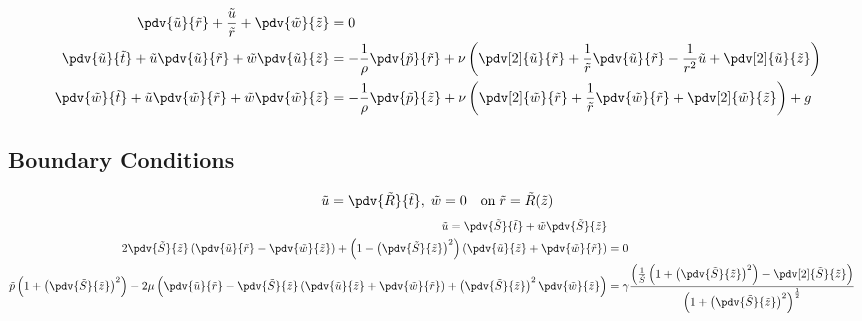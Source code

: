 \documentclass[12pt]{article}
\begin{document}
\begin{align}
\pdv{\tilde u}{\tilde r}+\frac{\tilde u}{\tilde r}+\pdv{\tilde w}{\tilde z}&=0\\
\pdv{\tilde u}{\tilde t}+\tilde u\pdv{\tilde u}{\tilde r}+\tilde w\pdv{\tilde u}{\tilde z}&=-\frac{1}{\rho}\pdv{\tilde p}{\tilde r}+\nu\left(\pdv[2]{\tilde u}{\tilde r}+\frac{1}{\tilde r}\pdv{\tilde u}{\tilde r}-\frac{1}{r^2}\tilde u+\pdv[2]{\tilde u}{\tilde z}\right)\\
\pdv{\tilde w}{\tilde t}+\tilde u\pdv{\tilde w}{\tilde r}+\tilde w\pdv{\tilde w}{\tilde z}&=-\frac{1}{\rho}\pdv{\tilde p}{\tilde z}+\nu\left(\pdv[2]{\tilde w}{\tilde r}+\frac{1}{\tilde r}\pdv{\tilde w}{\tilde r}+\pdv[2]{\tilde w}{\tilde z}\right) + g 
\end{align}
\subsection{Boundary Conditions}
\begin{align}
\tilde u=\pdv{\tilde R}{\tilde t},\;\tilde  w=0\quad\mathrm{on}\; \tilde r=\tilde R(\tilde z) 
\end{align}
\begin{align}
\tilde   u=\pdv{\tilde S}{\tilde t}+\tilde w\pdv{\tilde S}{\tilde z} \\
2\pdv{\tilde S}{\tilde z}\left(\pdv{\tilde u}{\tilde r}-\pdv{\tilde w}{\tilde z}\right)+\left(1-\left(\pdv{\tilde S}{\tilde z}\right)^2\right)\left(\pdv{\tilde u}{\tilde z}+\pdv{\tilde w}{\tilde r}\right)&=0\label{tangstress}\\
\tilde p\left(1+\left(\pdv{\tilde S}{\tilde z}\right)^2\right)-2\mu\left( \pdv{\tilde u}{\tilde r}-\pdv{\tilde S}{\tilde z}\left(\pdv{\tilde u}{\tilde z}+\pdv{\tilde w}{\tilde r}\right)+\left(\pdv{\tilde S}{\tilde z}\right)^2\pdv{\tilde w}{\tilde z}\right)&=\gamma\frac{\left(\frac{1}{\tilde S}\left(1+\left(\pdv{\tilde S}{\tilde z}\right)^2\right)-\pdv[2]{\tilde S}{\tilde z}\right)}{\left(1+\left(\pdv{\tilde S}{\tilde z}\right)^2\right)^{\frac{1}{2}}}\label{normstress}
\end{align}
\end{document}
